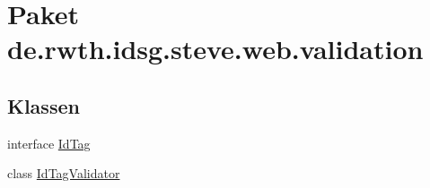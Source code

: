 \hypertarget{namespacede_1_1rwth_1_1idsg_1_1steve_1_1web_1_1validation}{\section{Paket de.\-rwth.\-idsg.\-steve.\-web.\-validation}
\label{namespacede_1_1rwth_1_1idsg_1_1steve_1_1web_1_1validation}
}
\subsection*{Klassen}
\begin{DoxyCompactItemize}
\item 
interface \hyperlink{interfacede_1_1rwth_1_1idsg_1_1steve_1_1web_1_1validation_1_1_id_tag}{Id\-Tag}
\item 
class \hyperlink{classde_1_1rwth_1_1idsg_1_1steve_1_1web_1_1validation_1_1_id_tag_validator}{Id\-Tag\-Validator}
\end{DoxyCompactItemize}
